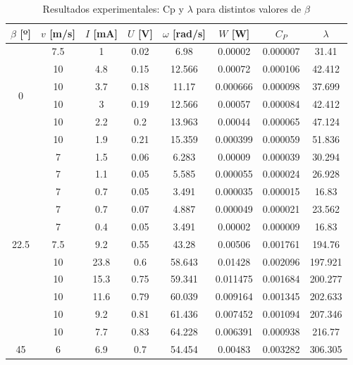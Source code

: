 \documentclass[10pt]{IEEEtran}
\begin{document}
\begin{table}[ht!]
  \centering
  \caption{Resultados experimentales: Cp y $\lambda$ para distintos valores de $\beta$}
  \label{tab: Aeroturbinas}
  \begin{tabular}{|c|c|c|c|c|c|c|c|}
    \hline
    $\beta$ [º] & $v$ [m/s] & $I$ [mA] & $U$ [V] & $\omega$ [rad/s] & $W$ [W] & $C_P$ & $\lambda$ \\
    \hline
    \multirow{6}{*}{0} & 7.5 & 1 & 0.02 & 6.98 & 0.00002 & 0.000007 & 31.41 \\
    \cline{2-8}
    & 10 & 4.8 & 0.15 & 12.566 & 0.00072 & 0.000106 & 42.412 \\
    \cline{2-8}
    & 10 & 3.7 & 0.18 & 11.17 & 0.000666 & 0.000098 & 37.699 \\
    \cline{2-8}
    & 10 & 3 & 0.19 & 12.566 & 0.00057 & 0.000084 & 42.412 \\
    \cline{2-8}
    & 10 & 2.2 & 0.2 & 13.963 & 0.00044 & 0.000065 & 47.124 \\
    \cline{2-8}
    & 10 & 1.9 & 0.21 & 15.359 & 0.000399 & 0.000059 & 51.836 \\
    \hline
    \multirow{11}{*}{22.5} & 7 & 1.5 & 0.06 & 6.283 & 0.00009 & 0.000039 & 30.294 \\
    \cline{2-8}
    & 7 & 1.1 & 0.05 & 5.585 & 0.000055 & 0.000024 & 26.928 \\
    \cline{2-8}
    & 7 & 0.7 & 0.05 & 3.491 & 0.000035 & 0.000015 & 16.83 \\
    \cline{2-8}
    & 7 & 0.7 & 0.07 & 4.887 & 0.000049 & 0.000021 & 23.562 \\
    \cline{2-8}
    & 7 & 0.4 & 0.05 & 3.491 & 0.00002 & 0.000009 & 16.83 \\
    \cline{2-8}
    & 7.5 & 9.2 & 0.55 & 43.28 & 0.00506 & 0.001761 & 194.76 \\
    \cline{2-8}
    & 10 & 23.8 & 0.6 & 58.643 & 0.01428 & 0.002096 & 197.921 \\
    \cline{2-8}
    & 10 & 15.3 & 0.75 & 59.341 & 0.011475 & 0.001684 & 200.277 \\
    \cline{2-8}
    & 10 & 11.6 & 0.79 & 60.039 & 0.009164 & 0.001345 & 202.633 \\
    \cline{2-8}
    & 10 & 9.2 & 0.81 & 61.436 & 0.007452 & 0.001094 & 207.346 \\
    \cline{2-8}
    & 10 & 7.7 & 0.83 & 64.228 & 0.006391 & 0.000938 & 216.77 \\
    \hline
    \multirow{13}{*}{45} & 6 & 6.9 & 0.7 & 54.454 & 0.00483 & 0.003282 & 306.305 \\

\end{tabular}
\end{table}
\end{document}
